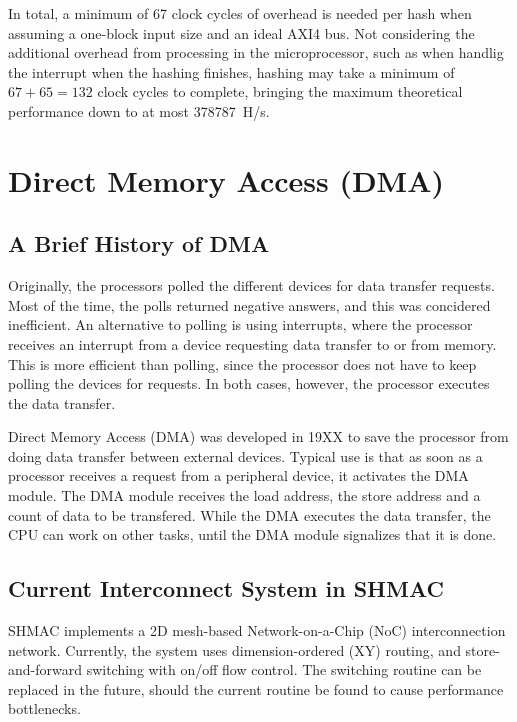 In total, a minimum of 67 clock cycles of overhead is needed per hash when assuming
a one-block input size and an ideal AXI4 bus. Not considering the additional overhead
from processing in the microprocessor, such as when handlig the interrupt when the
hashing finishes, hashing may take a minimum of $67 + 65 = 132$ clock cycles to
complete, bringing the maximum theoretical performance down to at most 378787~H/s.

\section{Direct Memory Access (DMA)}

\subsection{A Brief History of DMA}

Originally, the processors polled the different devices for data transfer requests. Most of the time, the polls returned negative answers, and this was concidered inefficient. An alternative to polling is using interrupts, where the processor receives an interrupt from a device requesting data transfer to or from memory. This is more efficient than polling, since the processor does not have to keep polling the devices for requests. In both cases, however, the processor executes the data transfer.


Direct Memory Access (DMA) was developed in 19XX to save the processor from doing data transfer between external devices. Typical use is that as soon as a processor receives a request from a peripheral device, it activates the DMA module. The DMA module receives the load address, the store address and a count of data to be transfered. While the DMA executes the data transfer, the CPU can work on other tasks, until the DMA module signalizes that it is done.

\subsection{Current Interconnect System in SHMAC}
SHMAC implements a 2D mesh-based Network-on-a-Chip (NoC) interconnection network. 
Currently, the system uses dimension-ordered (XY) routing, and store-and-forward switching with on/off flow control.
The switching routine can be replaced in the future, should the current routine be found to cause performance bottlenecks.

